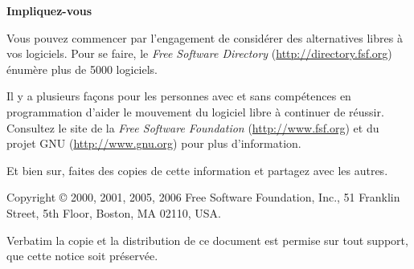 \documentclass[12pt]{article}
\begin{document}

\begin{center}
{\Large\bf Impliquez-vous}
\end{center}

Vous pouvez commencer par l'engagement de considérer des alternatives libres à
vos logiciels. Pour se faire, le \textit{Free Software Directory}
(\url{http://directory.fsf.org}) énumère plus de 5000 logiciels.


Il y a plusieurs façons pour les personnes avec et sans compétences en
programmation d'aider le mouvement du logiciel libre à continuer de réussir.
Consultez le site de la \textit{Free Software Foundation}
(\url{http://www.fsf.org}) et du projet GNU (\url{http://www.gnu.org}) pour
plus d'information.

Et bien sur, faites des copies de cette information et partagez avec les
autres.



\vspace{0.3in}

{\small

\noindent Copyright \copyright\/ 2000, 2001, 2005, 2006 Free Software Foundation, Inc., 51
Franklin Street, 5th Floor, Boston, MA 02110, USA.

Verbatim la copie et la distribution de ce document est permise sur tout support,
que cette notice soit préservée.

}
\end{document}
